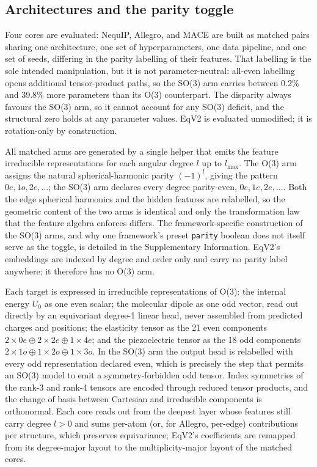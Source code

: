 \subsection*{Architectures and the parity toggle}

Four cores are evaluated: NequIP, Allegro, and MACE are built as matched pairs sharing one architecture, one set of hyperparameters, one data pipeline, and one set of seeds, differing in the parity labelling of their features. That labelling is the sole intended manipulation, but it is not parameter-neutral: all-even labelling opens additional tensor-product paths, so the SO(3) arm carries between 0.2\% and 39.8\% more parameters than its O(3) counterpart. The disparity always favours the SO(3) arm, so it cannot account for any SO(3) deficit, and the structural zero holds at any parameter values. EqV2 is evaluated unmodified; it is rotation-only by construction.

All matched arms are generated by a single helper that emits the feature irreducible representations for each angular degree $l$ up to $l_{\max}$. The O(3) arm assigns the natural spherical-harmonic parity $(-1)^{l}$, giving the pattern $0e, 1o, 2e, \dots$; the SO(3) arm declares every degree parity-even, $0e, 1e, 2e, \dots$. Both the edge spherical harmonics and the hidden features are relabelled, so the geometric content of the two arms is identical and only the transformation law that the feature algebra enforces differs. The framework-specific construction of the SO(3) arms, and why one framework's preset \texttt{parity} boolean does not itself serve as the toggle, is detailed in the Supplementary Information. EqV2's embeddings are indexed by degree and order only and carry no parity label anywhere; it therefore has no O(3) arm.

Each target is expressed in irreducible representations of O(3): the internal energy $U_0$ as one even scalar; the molecular dipole as one odd vector, read out directly by an equivariant degree-1 linear head, never assembled from predicted charges and positions; the elasticity tensor as the 21 even components $2\times0e \oplus 2\times2e \oplus 1\times4e$; and the piezoelectric tensor as the 18 odd components $2\times1o \oplus 1\times2o \oplus 1\times3o$. In the SO(3) arm the output head is relabelled with every odd representation declared even, which is precisely the step that permits an SO(3) model to emit a symmetry-forbidden odd tensor. Index symmetries of the rank-3 and rank-4 tensors are encoded through reduced tensor products, and the change of basis between Cartesian and irreducible components is orthonormal. Each core reads out from the deepest layer whose features still carry degree $l>0$ and sums per-atom (or, for Allegro, per-edge) contributions per structure, which preserves equivariance; EqV2's coefficients are remapped from its degree-major layout to the multiplicity-major layout of the matched cores.

